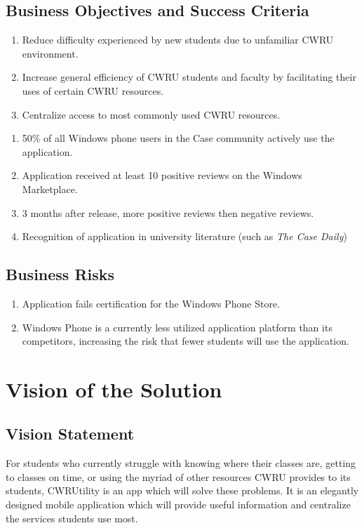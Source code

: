 \documentclass[pdftex,12pt,letter]{article}
\begin{document}
\subsection{Business Objectives and Success Criteria}
\begin{enumerate}[BO-1:]
\item Reduce difficulty experienced by new students due to unfamiliar CWRU environment.
\item Increase general efficiency of CWRU students and faculty by facilitating their uses of certain CWRU resources.
\item Centralize access to most commonly used CWRU resources.
\end{enumerate}

\begin{enumerate}[SC-1:]
\item 50\% of all Windows phone users in the Case community actively use the application.
\item Application received at least 10 positive reviews on the Windows Marketplace.
\item 3 months after release, more positive reviews then negative reviews.
\item Recognition of application in university literature (such as \emph{The Case Daily})
\end{enumerate}


\subsection{Business Risks}
\begin{enumerate}[BR-1:]
\item Application fails certification for the Windows Phone Store.
\item Windows Phone is a currently less utilized application platform than its competitors, increasing the risk that fewer students will use the application.
\end{enumerate}

\section{Vision of the Solution}
\subsection{Vision Statement}
For students who currently struggle with knowing where their classes are, getting to classes on time, or using the myriad of other resources CWRU provides to its students, CWRUtility is an app which will solve these problems. It is an elegantly designed mobile application which will provide useful information and centralize the services students use most.
\end{document}
